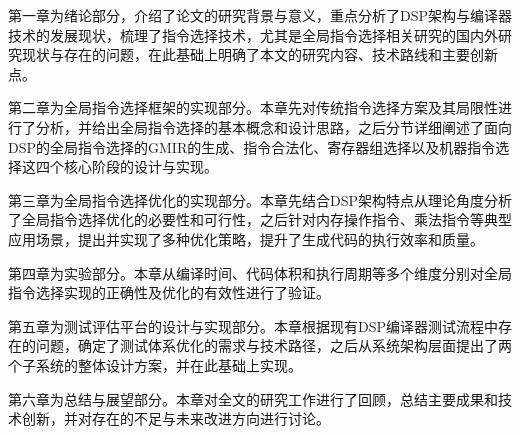 \par

第一章为绪论部分，介绍了论文的研究背景与意义，重点分析了DSP架构与编译器技术的发展现状，梳理了指令选择技术，尤其是全局指令选择相关研究的国内外研究现状与存在的问题，在此基础上明确了本文的研究内容、技术路线和主要创新点。

\par

第二章为全局指令选择框架的实现部分。本章先对传统指令选择方案及其局限性进行了分析，并给出全局指令选择的基本概念和设计思路，之后分节详细阐述了面向DSP的全局指令选择的GMIR的生成、指令合法化、寄存器组选择以及机器指令选择这四个核心阶段的设计与实现。

\par

第三章为全局指令选择优化的实现部分。本章先结合DSP架构特点从理论角度分析了全局指令选择优化的必要性和可行性，之后针对内存操作指令、乘法指令等典型应用场景，提出并实现了多种优化策略，提升了生成代码的执行效率和质量。

\par

第四章为实验部分。本章从编译时间、代码体积和执行周期等多个维度分别对全局指令选择实现的正确性及优化的有效性进行了验证。

\par

第五章为测试评估平台的设计与实现部分。本章根据现有DSP编译器测试流程中存在的问题，确定了测试体系优化的需求与技术路径，之后从系统架构层面提出了两个子系统的整体设计方案，并在此基础上实现。

\par

第六章为总结与展望部分。本章对全文的研究工作进行了回顾，总结主要成果和技术创新，并对存在的不足与未来改进方向进行讨论。
